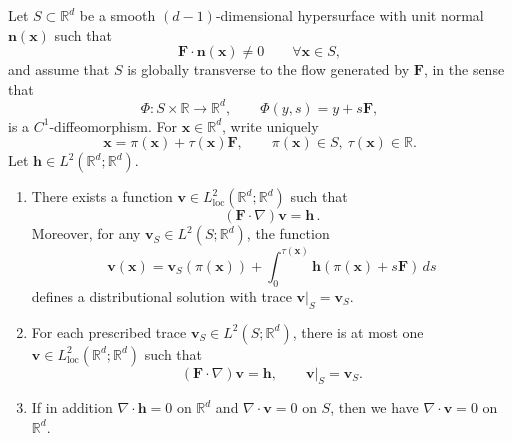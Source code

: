 \documentclass[10pt,a4paper]{amsart}
\begin{document}
\begin{theorem}
\label{thm:exist-unique-Rd}
Let $S\subset\mathbb R^d$ be a smooth $(d-1)$-dimensional hypersurface with unit normal
$\boldsymbol n(\boldsymbol x)$ such that
\[
\mathbf F\cdot \boldsymbol n(\boldsymbol x)\neq 0
\qquad \forall \boldsymbol x\in S,
\]
and assume that $S$ is globally transverse to the flow generated by $\mathbf F$, in the sense that
\[
\Phi:S\times\mathbb R\to\mathbb R^d,\qquad \Phi(y,s)=y+s\mathbf F,
\]
is a $C^1$-diffeomorphism. For $\boldsymbol x\in\mathbb R^d$, write uniquely
\[
\boldsymbol x=\pi(\boldsymbol x)+\tau(\boldsymbol x)\mathbf F,\qquad \pi(\boldsymbol x)\in S,\ \tau(\boldsymbol x)\in\mathbb R.
\]
Let $\boldsymbol h\in L^2(\mathbb R^d;\mathbb R^d)$.

\begin{enumerate}
\item[(i)]
There exists a function $\boldsymbol v\in L^2_{\mathrm{loc}}(\mathbb R^d;\mathbb R^d)$ such that {{}
\[
(\mathbf F\cdot\nabla)\boldsymbol v=\boldsymbol h\,.
\]}
Moreover, for any $\boldsymbol v_S\in L^2(S;\mathbb R^d)$, the function
\[
\boldsymbol v(\boldsymbol x)=\boldsymbol v_S(\pi(\boldsymbol x))+\int_{0}^{\tau(\boldsymbol x)}\boldsymbol h(\pi(\boldsymbol x)+s\mathbf F)\,ds
\]
defines a distributional solution with trace $\boldsymbol v|_S=\boldsymbol v_S$.

\item[(ii)]
For each prescribed trace $\boldsymbol v_S\in L^2(S;\mathbb R^d)$, there is at most one
$\boldsymbol v\in L^2_{\mathrm{loc}}(\mathbb R^d;\mathbb R^d)$ such that
\[
(\mathbf F\cdot\nabla)\boldsymbol v={{} \boldsymbol h},
\qquad
\boldsymbol v|_S=\boldsymbol v_S.
\]
\item[(iii)]
If in addition $\nabla\cdot\boldsymbol h=0$ on $\mathbb{R}^d$ and $\nabla\cdot\boldsymbol v= 0$ on $S$,
then we have $\nabla\cdot\boldsymbol v=0$ on $\mathbb{R}^d$.
\end{enumerate}
\end{theorem}
\end{document}
